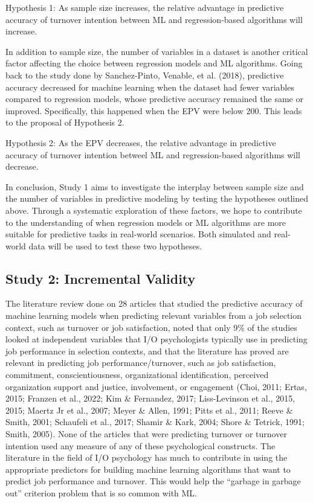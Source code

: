 \documentclass[
  man]{apa7}
\begin{document}
Hypothesis 1: As sample size increases, the relative advantage in predictive accuracy of turnover intention between ML and regression-based algorithms will increase.

In addition to sample size, the number of variables in a dataset is another critical factor affecting the choice between regression models and ML algorithms.
Going back to the study done by Sanchez-Pinto, Venable, et al. (2018), predictive accuracy decreased for machine learning when the dataset had fewer variables compared to regression models, whose predictive accuracy remained the same or improved.
Specifically, this happened when the EPV were below 200.
This leads to the proposal of Hypothesis 2.

Hypothesis 2: As the EPV decreases, the relative advantage in predictive accuracy of turnover intention betweel ML and regression-based algorithms will decrease.

In conclusion, Study 1 aims to investigate the interplay between sample size and the number of variables in predictive modeling by testing the hypotheses outlined above.
Through a systematic exploration of these factors, we hope to contribute to the understanding of when regression models or ML algorithms are more suitable for predictive tasks in real-world scenarios.
Both simulated and real-world data will be used to test these two hypotheses.

\hypertarget{study-2-incremental-validity}{%
\subsection{Study 2: Incremental Validity}\label{study-2-incremental-validity}}

The literature review done on 28 articles that studied the predictive accuracy of machine learning models when predicting relevant variables from a job selection context, such as turnover or job satisfaction, noted that only 9\% of the studies looked at independent variables that I/O psychologists typically use in predicting job performance in selection contexts, and that the literature has proved are relevant in predicting job performance/turnover, such as job satisfaction, commitment, conscientiousness, organizational identification, perceived organization support and justice, involvement, or engagement (Choi, 2011; Ertas, 2015; Franzen et al., 2022; Kim \& Fernandez, 2017; Liss-Levinson et al., 2015, 2015; Maertz Jr et al., 2007; Meyer \& Allen, 1991; Pitts et al., 2011; Reeve \& Smith, 2001; Schaufeli et al., 2017; Shamir \& Kark, 2004; Shore \& Tetrick, 1991; Smith, 2005). None of the articles that were predicting turnover or turnover intention used any measure of any of these psychological constructs.
The literature in the field of I/O psychology has much to contribute in using the appropriate predictors for building machine learning algorithms that want to predict job performance and turnover.
This would help the ``garbage in garbage out'' criterion problem that is so common with ML.
\end{document}
